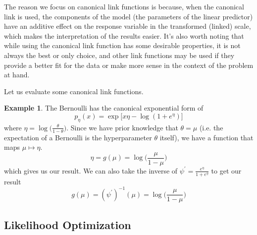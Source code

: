 \documentclass{article}
\theoremstyle{definition}
\newtheorem{example}{Example}[section]
\begin{document}
  The reason we focus on canonical link functions is because, when the canonical link is used, the components of the model (the parameters of the linear predictor) have an additive effect on the response variable in the transformed (linked) scale, which makes the interpretation of the results easier. It's also worth noting that while using the canonical link function has some desirable properties, it is not always the best or only choice, and other link functions may be used if they provide a better fit for the data or make more sense in the context of the problem at hand.

  Let us evaluate some canonical link functions. 

  \begin{example}
  The Bernoulli has the canonical exponential form of 
  \[p_\eta (x) = \exp \big[ x \eta - \log (1 + e^\eta) \big]\]
  where $\eta = \log \big( \frac{\theta}{1 - \theta} \big)$. Since we have prior knowledge that $\theta = \mu$ (i.e. the expectation of a Bernoulli is the hyperparameter $\theta$ itself), we have a function that maps $\mu \mapsto \eta$. 
  \[\eta = g(\mu) = \log \bigg( \frac{\mu}{1 - \mu} \bigg)\]
  which gives us our result. We can also take the inverse of $\psi^\prime = \frac{e^\eta}{1 + e^\eta}$ to get our result 
  \[g (\mu) = (\psi^\prime)^{-1} (\mu) = \log \bigg( \frac{\mu}{1 - \mu} \bigg) \]
  \end{example}

  \subsection{Likelihood Optimization}
\end{document}
